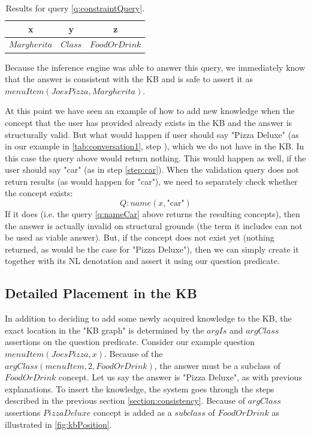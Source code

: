 \begin{table}[H]
\centering
\caption{Results for query \ref{q:constraintQuery}.}
\label{tab:constraintResults}
\begin{tabular}{|c|c|c|}
	\hline
	\textbf{x} & \textbf{y} & \textbf{z} \\
    \hline
    $Margherita$ & $Class$ & $FoodOrDrink$ \\
    \hline
\end{tabular}
\end{table}
Because the inference engine was able to answer this query, we immediately
know that the answer is consistent with the KB and is safe to assert it as 
$menuItem(JoesPizza,Margherita)$. 

At this point we have seen an example of how to add new knowledge when the
concept that the user has provided already exists in the KB and the answer is 
structurally valid. But what would happen if user should say "Pizza Deluxe" 
(as in our example in \autoref{tab:conversation1}, step 
), which we do not have in the KB. In this case the query
above would return nothing. This would happen as well, if the user should say 
"car" (as in step \ref{step:car}). When the validation query does not return
results (as would happen for "car"), we need to separately check whether the 
concept exists:
\begin{equation}\label{q:nameCar}
Q:name(x,\text{"car"})
\end{equation}
If it does (i.e. the query \ref{q:nameCar} above returns the resulting 
concepts), then the answer is actually invalid on structural grounds (the term 
it includes can not be used as viable answer).
But, if the concept does not exist yet (nothing returned, as would be the case 
for "Pizza Deluxe"), then we can simply create it together with its NL 
denotation and assert it using our question predicate.

\subsection{Detailed Placement in the KB}
\label{section:placement}
In addition to deciding to add some newly acquired knowledge to the KB, the 
exact location in the "KB graph" is determined by the $argIs$ and $argClass$
assertions on the question predicate. Consider our example question
$menuItem(JoesPizza,x)$. Because of the $argClass(menuItem,2,FoodOrDrink)$, the
answer must be a subclass of $FoodOrDrink$ concept. Let us say the answer is
"Pizza Deluxe", as with previous explanations. To insert the knowledge, the 
system goes through the steps described in the previous section 
\ref{section:consistency}. Because of $argClass$ assertions $PizzaDeluxe$ 
concept is added as a $subclass$ of $FoodOrDrink$ as illustrated in 
\autoref{fig:kbPosition}.

